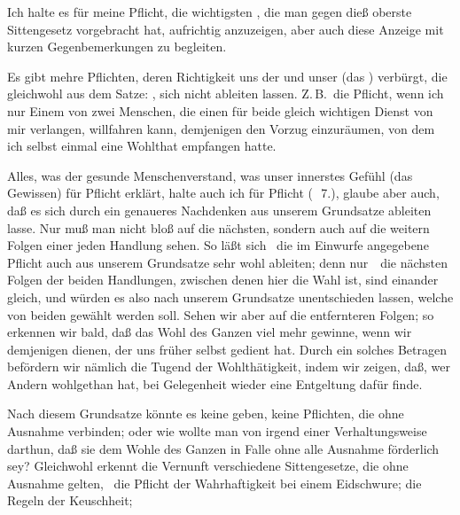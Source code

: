Ich halte es für meine Pflicht, die wichtigsten , die man gegen dieß oberste Sittengesetz vorgebracht hat, aufrichtig anzuzeigen, aber auch diese Anzeige mit kurzen Gegenbemerkungen zu begleiten.\par
{} Es gibt mehre Pflichten, deren Richtigkeit uns der  und unser  (das ) verbürgt, die gleichwohl aus dem Satze: , sich nicht ableiten lassen. Z.\,B.\ die Pflicht, wenn ich nur Einem von zwei Menschen, die einen für beide gleich wichtigen Dienst von mir verlangen, willfahren kann, demjenigen den Vorzug einzuräumen, von dem ich selbst einmal eine Wohlthat empfangen hatte.\par
{} Alles, was der gesunde Menschenverstand, was unser innerstes Gefühl (das Gewissen) für Pflicht erklärt, halte auch ich für Pflicht (\ \no\,7.), glaube aber auch, daß es sich durch ein genaueres Nachdenken aus unserem Grundsatze ableiten lasse. Nur muß man nicht bloß auf die nächsten, sondern auch auf die weitern Folgen einer jeden Handlung sehen. So läßt sich \zB\ die im Einwurfe angegebene Pflicht auch aus unserem Grundsatze sehr wohl ableiten; denn nur~\ die nächsten Folgen der beiden Handlungen, zwischen denen hier die Wahl ist, sind einander gleich, und würden es also nach unserem Grundsatze unentschieden lassen, welche von beiden gewählt werden soll. Sehen wir aber auf die entfernteren Folgen; so erkennen wir bald, daß das Wohl des Ganzen viel mehr gewinne, wenn wir demjenigen dienen, der uns früher selbst gedient hat. Durch ein solches Betragen befördern wir nämlich die Tugend der Wohlthätigkeit, indem wir zeigen, daß, wer Andern wohlgethan hat, bei Gelegenheit wieder eine Entgeltung dafür finde. \Usw\par
{} Nach diesem Grundsatze könnte es keine  geben, keine Pflichten, die ohne Ausnahme verbinden; oder wie wollte man von irgend einer Verhaltungsweise darthun, daß sie dem Wohle des Ganzen in  Falle ohne alle Ausnahme förderlich sey? Gleichwohl erkennt die Vernunft verschiedene Sittengesetze, die ohne Ausnahme gelten, \zB\ die Pflicht der Wahrhaftigkeit bei einem Eidschwure; die Regeln der Keuschheit; \udgl\par
